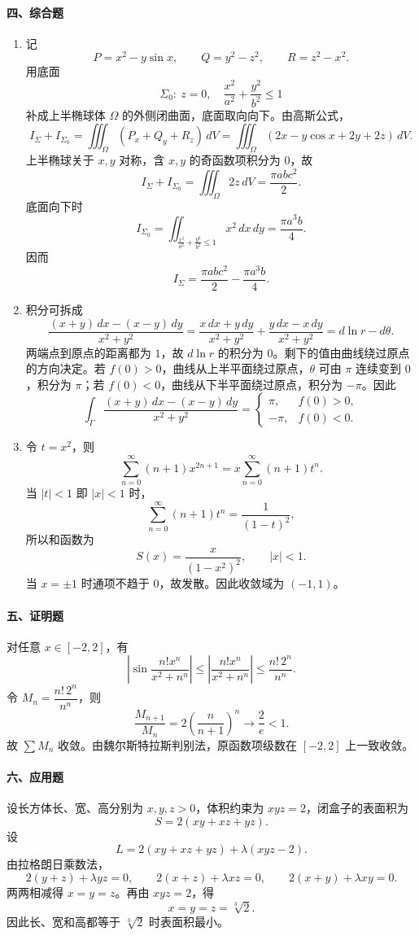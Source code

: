 \paragraph*{四、综合题}
\begin{enumerate}
  \item 记
  \[
    P=x^2-y\sin x,\qquad Q=y^2-z^2,\qquad R=z^2-x^2.
  \]
  用底面
  \[
    \Sigma_0:\ z=0,\quad \frac{x^2}{a^2}+\frac{y^2}{b^2}\le1
  \]
  补成上半椭球体 $\Omega$ 的外侧闭曲面，底面取向向下。由高斯公式，
  \[
    I_\Sigma+I_{\Sigma_0}
    =\iiint_\Omega (P_x+Q_y+R_z)\,dV
    =\iiint_\Omega (2x-y\cos x+2y+2z)\,dV.
  \]
  上半椭球关于 $x,y$ 对称，含 $x,y$ 的奇函数项积分为 $0$，故
  \[
    I_\Sigma+I_{\Sigma_0}=\iiint_\Omega 2z\,dV
    =\frac{\pi ab c^2}{2}.
  \]
  底面向下时
  \[
    I_{\Sigma_0}=\iint_{\frac{x^2}{a^2}+\frac{y^2}{b^2}\le1}x^2\,dx\,dy
    =\frac{\pi a^3b}{4}.
  \]
  因而
  \[
    I_\Sigma=\frac{\pi ab c^2}{2}-\frac{\pi a^3b}{4}.
  \]

  \item 积分可拆成
  \[
    \frac{(x+y)\,dx-(x-y)\,dy}{x^2+y^2}
    =\frac{x\,dx+y\,dy}{x^2+y^2}
    +\frac{y\,dx-x\,dy}{x^2+y^2}
    =d\ln r-d\theta.
  \]
  两端点到原点的距离都为 $1$，故 $d\ln r$ 的积分为 $0$。剩下的值由曲线绕过原点的方向决定。若
  $f(0)>0$，曲线从上半平面绕过原点，$\theta$ 可由 $\pi$ 连续变到 $0$，积分为 $\pi$；若
  $f(0)<0$，曲线从下半平面绕过原点，积分为 $-\pi$。因此
  \[
    \int_\Gamma
    \frac{(x+y)\,dx-(x-y)\,dy}{x^2+y^2}
    =
    \begin{cases}
      \pi, & f(0)>0,\\
      -\pi, & f(0)<0.
    \end{cases}
  \]

  \item 令 $t=x^2$，则
  \[
    \sum_{n=0}^{\infty}(n+1)x^{2n+1}
    =x\sum_{n=0}^{\infty}(n+1)t^n.
  \]
  当 $|t|<1$ 即 $|x|<1$ 时，
  \[
    \sum_{n=0}^{\infty}(n+1)t^n=\frac{1}{(1-t)^2},
  \]
  所以和函数为
  \[
    S(x)=\frac{x}{(1-x^2)^2},\qquad |x|<1.
  \]
  当 $x=\pm1$ 时通项不趋于 $0$，故发散。因此收敛域为 $(-1,1)$。
\end{enumerate}

\paragraph*{五、证明题}
对任意 $x\in[-2,2]$，有
\[
  \left|\sin\frac{n!x^n}{x^2+n^n}\right|
  \le
  \left|\frac{n!x^n}{x^2+n^n}\right|
  \le
  \frac{n!\,2^n}{n^n}.
\]
令 $M_n=\dfrac{n!\,2^n}{n^n}$，则
\[
  \frac{M_{n+1}}{M_n}
  =2\left(\frac{n}{n+1}\right)^n\longrightarrow \frac{2}{e}<1.
\]
故 $\sum M_n$ 收敛。由魏尔斯特拉斯判别法，原函数项级数在 $[-2,2]$ 上一致收敛。

\paragraph*{六、应用题}
设长方体长、宽、高分别为 $x,y,z>0$，体积约束为 $xyz=2$，闭盒子的表面积为
\[
  S=2(xy+xz+yz).
\]
设
\[
  L=2(xy+xz+yz)+\lambda(xyz-2).
\]
由拉格朗日乘数法，
\[
  2(y+z)+\lambda yz=0,\qquad
  2(x+z)+\lambda xz=0,\qquad
  2(x+y)+\lambda xy=0.
\]
两两相减得 $x=y=z$。再由 $xyz=2$，得
\[
  x=y=z=\sqrt[3]{2}.
\]
因此长、宽和高都等于 $\sqrt[3]{2}$ 时表面积最小。
